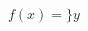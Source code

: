 \documentclass[12pt]{article}
\begin{document}

\begin{tabular}{p{2.6cm} | p{6.0cm} }
\end{tabular}


\begin{tabular}{c|D{\%}{\cdot}{-1}}
\end{tabular}

\AnyDeclarationCommand{\eq}{\begin{equation}}


\wrapcommand{$}


\wrapcommand{\[}


$f(x) = \} {} y$
\end{document}
